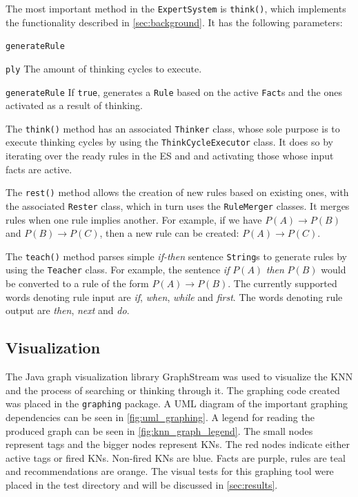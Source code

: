 \documentclass[titlepage,11pt]{article}
\newcommand{\code}[1]{\texttt{#1}}
\begin{document}
The most important method in the \code{ExpertSystem} is \code{think()}, which implements the functionality described in \cref{sec:background}. It has the following parameters:

\begin{labeling}{\code{generateRule}}
	\item[\code{ply}] The amount of thinking cycles to execute.
	\item[\code{generateRule}] If \code{true}, generates a \code{Rule} based on the active \code{Fact}s and the ones activated as a result of thinking.
\end{labeling}

The \code{think()} method has an associated \code{Thinker} class, whose sole purpose is to execute thinking cycles by using the \code{ThinkCycleExecutor} class. It does so by iterating over the ready rules in the ES and and activating those whose input facts are active.

The \code{rest()} method allows the creation of new rules based on existing ones, with the associated \code{Rester} class, which in turn uses the \code{RuleMerger} classes. It merges rules when one rule implies another. For example, if we have $P(A) \rightarrow P(B)$ and $P(B) \rightarrow P(C)$, then a new rule can be created: $P(A) \rightarrow P(C)$.

The \code{teach()} method parses simple \emph{if-then} sentence \code{String}s to generate rules by using the \code{Teacher} class. For example, the sentence \emph{if} $P(A)$ \emph{then} $P(B)$ would be converted to a rule of the form $P(A) \rightarrow P(B)$. The currently supported words denoting rule input are \emph{if}, \emph{when}, \emph{while} and \emph{first}. The words denoting rule output are \emph{then}, \emph{next} and \emph{do}.

\subsection{Visualization} \label{sec:impl_visualization}
The Java graph visualization library GraphStream was used to visualize the KNN and the process of searching or thinking through it. The graphing code created was placed in the \code{graphing} package. A UML diagram of the important graphing dependencies can be seen in \cref{fig:uml_graphing}. A legend for reading the produced graph can be seen in \cref{fig:knn_graph_legend}. The small nodes represent tags and the bigger nodes represent KNs. The red nodes indicate either active tags or fired KNs. Non-fired KNs are blue. Facts are purple, rules are teal and recommendations are orange. The visual tests for this graphing tool were placed in the test directory and will be discussed in \cref{sec:results}.
\end{document}
